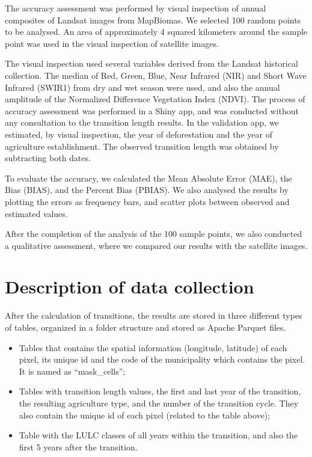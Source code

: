 \documentclass[essd, manuscript]{copernicus}
\begin{document}
The accuracy assessment was performed by visual inspection of annual composites of Landsat images from MapBiomas.
We selected 100 random points to be analysed.
An area of approximately 4 squared kilometers around the sample point was used in the visual inspection of satellite images.

The visual inspection used several variables derived from the Landsat historical collection.
The median of Red, Green, Blue, Near Infrared (NIR) and Short Wave Infrared (SWIR1) from dry and wet season were used, and also the annual amplitude of the Normalized Difference Vegetation Index (NDVI).
The process of accuracy assessment was performed in a Shiny app, and was conducted without any consultation to the transition length results.
In the validation app, we estimated, by visual inspection, the year of deforestation and the year of agriculture establishment.
The observed transition length was obtained by subtracting both dates.

To evaluate the accuracy, we calculated the Mean Absolute Error (MAE), the Bias (BIAS), and the Percent Bias (PBIAS).
We also analysed the results by plotting the errors as frequency bars, and scatter plots between observed and estimated values.

After the completion of the analysis of the 100 sample points, we also conducted a qualitative assessment, where we compared our results with the satellite images.

\section{Description of data collection}

After the calculation of transitions, the results are stored in three different types of tables, organized in a folder structure and stored as Apache Parquet files.

\begin{itemize}
\item
  Tables that contains the spatial information (longitude, latitude) of each pixel, its unique id and the code of the municipality which contains the pixel.
  It is named as ``mask\_cells'';
\item
  Tables with transition length values, the first and last year of the transition, the resulting agriculture type, and the number of the transition cycle.
  They also contain the unique id of each pixel (related to the table above);
\item
  Table with the LULC classes of all years within the transition, and also the first 5 years after the transition.
\end{itemize}
\end{document}
